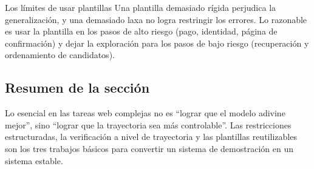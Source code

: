 \begin{warningbox}{Los límites de usar plantillas}
Una plantilla demasiado rígida perjudica la generalización, y una demasiado laxa no logra restringir los errores. Lo razonable es usar la plantilla en los pasos de alto riesgo (pago, identidad, página de confirmación) y dejar la exploración para los pasos de bajo riesgo (recuperación y ordenamiento de candidatos).
\end{warningbox}

\subsection{Resumen de la sección}
Lo esencial en las tareas web complejas no es ``lograr que el modelo adivine mejor'', sino ``lograr que la trayectoria sea más controlable''. Las restricciones estructuradas, la verificación a nivel de trayectoria y las plantillas reutilizables son los tres trabajos básicos para convertir un sistema de demostración en un sistema estable.
